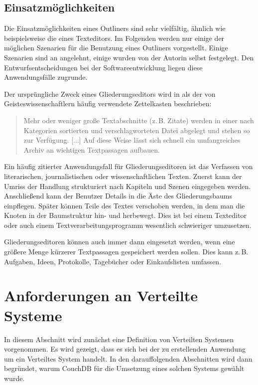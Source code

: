 \subsection{Einsatzmöglichkeiten}
\label{subsec:einsatzmoegl}

Die Einsatzmöglichkeiten eines Outliners sind sehr vielfältig, ähnlich wie beispielsweise die eines Texteditors. Im Folgenden werden nur einige der möglichen Szenarien für die Benutzung eines Outliners vorgestellt. Einige Szenarien sind an \cite{gliederungseditor} angelehnt, einige wurden von der Autorin selbst festgelegt. Den Entwurfsentscheidungen bei der Softwareentwicklung liegen diese Anwendungsfälle zugrunde.

Der ursprüngliche Zweck eines Gliederungseditors wird in \cite{gliederungseditor} als der von Geisteswissenschaftlern häufig verwendete Zettelkasten beschrieben: 

\begin{quote}
Mehr oder weniger große Textabschnitte (z.\,B. Zitate) werden in einer nach Kategorien sortierten und verschlagworteten Datei abgelegt und stehen so zur Verfügung. [...] Auf diese Weise lässt sich schnell ein umfangreiches Archiv an wichtigen Textpassagen aufbauen.
\end{quote}

Ein häufig zitierter Anwendungsfall für Gliederungseditoren ist das Verfassen von literarischen, journalistischen oder wissenschaftlichen Texten. Zuerst kann der Umriss der Handlung strukturiert nach Kapiteln und Szenen eingegeben werden. Anschließend kann der Benutzer Details in die Äste des Gliederungsbaums einpflegen. Später können Teile des Textes verschoben werden, in dem man die Knoten in der Baumstruktur hin- und herbewegt. Dies ist bei einem Texteditor oder auch einem Textverarbeitungsprogramm wesentlich schwieriger umzusetzen.

Gliederungseditoren können auch immer dann eingesetzt werden, wenn eine größere Menge kürzerer Textpassagen gespeichert werden sollen. Dies kann z.\,B. Aufgaben, Ideen, Protokolle, Tagebücher oder Einkaufslisten umfassen.



\section{Anforderungen an Verteilte Systeme}

In diesem Abschnitt wird zunächst eine Definition von Verteilten Systemen vorgenommen. Es wird gezeigt, dass es sich bei der zu erstellenden Anwendung um ein Verteiltes System handelt. In den darauffolgenden Abschnitten wird dann begründet, warum CouchDB für die Umsetzung eines solchen Systems gewählt wurde. 

